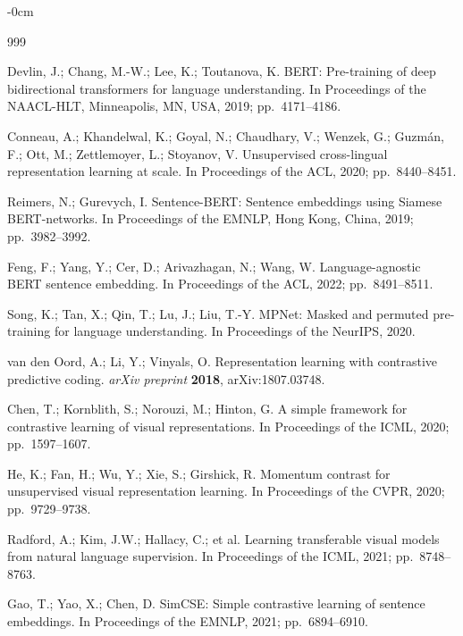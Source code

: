 \documentclass[applsci,article,submit,pdftex,moreauthors]{Definitions/mdpi}
\begin{document}
\begin{adjustwidth}{-\extralength}{0cm}

\begin{thebibliography}{999}

Devlin, J.; Chang, M.-W.; Lee, K.; Toutanova, K. BERT: Pre-training of deep bidirectional transformers for language understanding. In Proceedings of the NAACL-HLT, Minneapolis, MN, USA, 2019; pp.\ 4171--4186.

Conneau, A.; Khandelwal, K.; Goyal, N.; Chaudhary, V.; Wenzek, G.; Guzm\'an, F.; Ott, M.; Zettlemoyer, L.; Stoyanov, V. Unsupervised cross-lingual representation learning at scale. In Proceedings of the ACL, 2020; pp.\ 8440--8451.

Reimers, N.; Gurevych, I. Sentence-BERT: Sentence embeddings using Siamese BERT-networks. In Proceedings of the EMNLP, Hong Kong, China, 2019; pp.\ 3982--3992.

Feng, F.; Yang, Y.; Cer, D.; Arivazhagan, N.; Wang, W. Language-agnostic BERT sentence embedding. In Proceedings of the ACL, 2022; pp.\ 8491--8511.

Song, K.; Tan, X.; Qin, T.; Lu, J.; Liu, T.-Y. MPNet: Masked and permuted pre-training for language understanding. In Proceedings of the NeurIPS, 2020.

van den Oord, A.; Li, Y.; Vinyals, O. Representation learning with contrastive predictive coding. \textit{arXiv preprint} \textbf{2018}, arXiv:1807.03748.

Chen, T.; Kornblith, S.; Norouzi, M.; Hinton, G. A simple framework for contrastive learning of visual representations. In Proceedings of the ICML, 2020; pp.\ 1597--1607.

He, K.; Fan, H.; Wu, Y.; Xie, S.; Girshick, R. Momentum contrast for unsupervised visual representation learning. In Proceedings of the CVPR, 2020; pp.\ 9729--9738.

Radford, A.; Kim, J.W.; Hallacy, C.; et al. Learning transferable visual models from natural language supervision. In Proceedings of the ICML, 2021; pp.\ 8748--8763.

Gao, T.; Yao, X.; Chen, D. SimCSE: Simple contrastive learning of sentence embeddings. In Proceedings of the EMNLP, 2021; pp.\ 6894--6910.


\end{thebibliography}
\end{adjustwidth}
\end{document}
